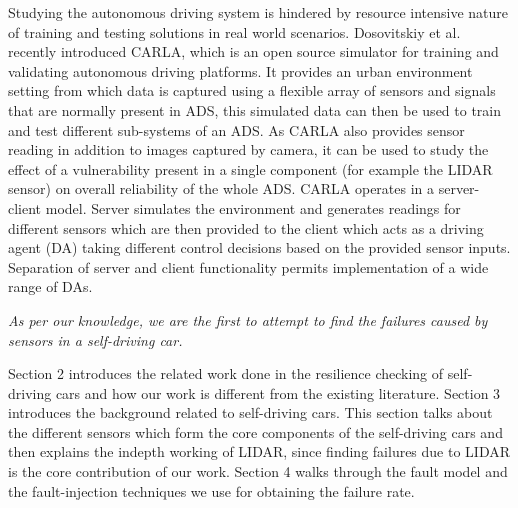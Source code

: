 Studying the autonomous driving system is hindered by resource intensive nature of training and testing solutions in real world scenarios. Dosovitskiy et al.~\cite{carla18corl} recently introduced CARLA, which is an open source simulator for training and validating autonomous driving platforms. It provides an urban environment setting from which data is captured using a flexible array of sensors and signals that are normally present in ADS, this simulated data can then be used to train and test different sub-systems of an ADS. As CARLA also provides sensor reading in addition to images captured by camera, it can be used to study the effect of a vulnerability present in a single component (for example the LIDAR sensor) on overall reliability of the whole ADS. CARLA operates in a server-client model. Server simulates the environment and generates readings for different sensors which are then provided to the client which acts as a driving agent (DA) taking different control decisions based on the provided sensor inputs. Separation of server and client functionality permits implementation of a wide range of DAs.

\emph{As per our knowledge, we are the first to attempt to find the failures caused by sensors in a self-driving car.}

Section 2 introduces the related work done in the resilience checking of self-driving cars and how our work is different from the existing literature. Section 3 introduces the background related to self-driving cars. This section talks about the different sensors which form the core components of the self-driving cars and then explains the indepth working of LIDAR, since finding failures due to LIDAR is the core contribution of our work.  Section 4 walks through the fault model and the fault-injection techniques we use for obtaining the failure rate. 